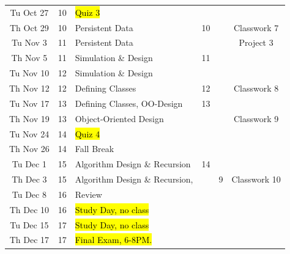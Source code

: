\documentclass[letter,10pt]{article}
\begin{document}
\begin{tabular}{c c l l l c}
Tu Oct 27  & 10 & \hl{Quiz 3}  & & & \\
Th Oct 29  & 10 & Persistent Data  & 10 & & Classwork 7 \\ \hline
Tu Nov 3   & 11 & Persistent Data &  & & Project 3\\
Th Nov 5   & 11 &  Simulation \& Design & 11 & & \\
Tu Nov 10  & 12 & Simulation \& Design & & & \\
Th Nov 12  & 12 & Defining Classes & 12  & &  Classwork 8 \\
Tu Nov 17  & 13 & Defining Classes, OO-Design & 13 & & \\
Th Nov 19  & 13 & Object-Oriented Design & & & Classwork 9 \\
Tu Nov 24  & 14 & \hl{Quiz 4} & & &  \\
Th Nov 26  & 14 & {\color{cadmiumgreen}Fall Break} & & & \\ \hline
Tu Dec 1   & 15 & Algorithm Design \& Recursion & 14 & & \\
Th Dec 3   & 15 & Algorithm Design \& Recursion,  & & 9 & Classwork 10 \\
Tu Dec 8   & 16 & Review & & & \\
Th Dec 10  & 16 & \hl{Study Day, no class} & & & \\
Tu Dec 15  & 17 & \hl{Study Day, no class} & & & \\
Th Dec 17  & 17 & \hl{Final Exam, 6-8PM.} & & & \\
\end{tabular}
\end{document}
